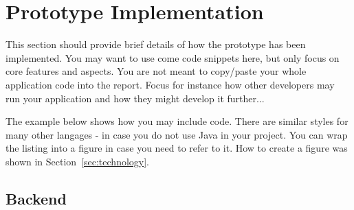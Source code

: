 \section{Prototype Implementation}
\label{sec:implementation}

This section should provide brief details of how the prototype has been implemented.
You may want to use come code snippets here, but only focus on core features and aspects.
You are not meant to copy/paste your whole application code into the report.
Focus for instance how other developers may run your application and how they might develop it further...


The example below shows how you may include code. There are similar
styles for many other langages - in case you do not use Java in your
project. You can wrap the listing into a figure in case you need to
refer to it. How to create a figure was shown in Section~\ref{sec:technology}.




\subsection{Backend}

